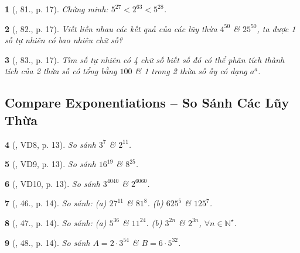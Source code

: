 \documentclass{article}
\newtheorem{baitoan}{}
\begin{document}
\begin{baitoan}[\cite{Binh_Toan_6_tap_1}, 81., p. 17]
	 Chứng minh: $5^{27} < 2^{63} < 5^{28}$.
\end{baitoan}

\begin{baitoan}[\cite{Binh_Toan_6_tap_1}, 82., p. 17]
	Viết liền nhau các kết quả của các lũy thừa $4^{50}$ \& $25^{50}$, ta được 1 số tự nhiên có bao nhiêu chữ số?
\end{baitoan}

\begin{baitoan}[\cite{Binh_Toan_6_tap_1}, 83., p. 17]
	Tìm số tự nhiên có 4 chữ số biết số đó có thể phân tích thành tích của 2 thừa số có tổng bằng $100$ \& 1 trong 2 thừa số ấy có dạng $a^a$.
\end{baitoan}


\subsection{Compare Exponentiations -- So Sánh Các Lũy Thừa}

\begin{baitoan}[\cite{Tuyen_Toan_6}, VD8, p. 13]
	So sánh $3^7$ \& $2^{11}$.
\end{baitoan}

\begin{baitoan}[\cite{Tuyen_Toan_6}, VD9, p. 13]
	So sánh $16^{19}$ \& $8^{25}$.
\end{baitoan}

\begin{baitoan}[\cite{Tuyen_Toan_6}, VD10, p. 13]
	So sánh $3^{4040}$ \& $2^{6060}$.
\end{baitoan}

\begin{baitoan}[\cite{Tuyen_Toan_6}, 46., p. 14]
	So sánh: (a) $27^{11}$ \& $81^8$. (b) $625^5$ \& $125^7$.
\end{baitoan}

\begin{baitoan}[\cite{Tuyen_Toan_6}, 47., p. 14]
	So sánh: (a) $5^{36}$ \& $11^{24}$. (b) $3^{2n}$ \& $2^{3n}$, $\forall n\in\mathbb{N}^\star$.
\end{baitoan}

\begin{baitoan}[\cite{Tuyen_Toan_6}, 48., p. 14]
	So sánh $A = 2\cdot3^{54}$ \& $B = 6\cdot5^{32}$.
\end{baitoan}
\end{document}
